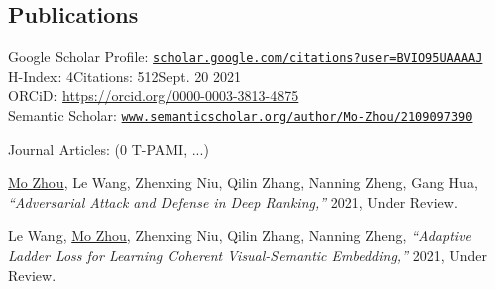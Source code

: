 \documentclass[10pt,margin,line,pifont,palatino,courier]{res}
\begin{document}
\begin{resume}

%


\section{\sc Publications}
	Google Scholar Profile:
	\href{https://scholar.google.com/citations?user=BVIO95UAAAAJ}{\small\texttt{scholar.google.com/citations?user=BVIO95UAAAAJ}}\\
	\hspace*{9.7em}H-Index: 4\qquad Citations: 512\qquad Sept. 20 2021\\
	\hspace*{6.1em}ORCiD: {\small\url{https://orcid.org/0000-0003-3813-4875}}\\
	\hspace*{2.1em}Semantic Scholar: \href{https://www.semanticscholar.org/author/Mo-Zhou/2109097390}{\small\texttt{www.semanticscholar.org/author/Mo-Zhou/2109097390}}

	{\sc Journal Articles:} \hfill(0 T-PAMI, ...)\\

\begin{enumerate}[noitemsep, leftmargin=*, label={[J0{\arabic*}]}]

\item \underline{Mo Zhou}, Le Wang, Zhenxing Niu, Qilin Zhang, Nanning Zheng, Gang Hua,
\textit{``Adversarial Attack and Defense in Deep Ranking,''}
2021, Under Review.

\item Le Wang, \underline{Mo Zhou}, Zhenxing Niu, Qilin Zhang, Nanning Zheng,
\textit{``Adaptive Ladder Loss for Learning Coherent Visual-Semantic Embedding,''}
2021, Under Review.

\end{enumerate}


\end{resume}
\end{document}
